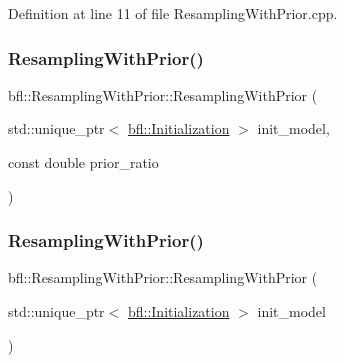 Definition at line 11 of file Resampling\+With\+Prior.\+cpp.

\mbox{\label{classbfl_1_1ResamplingWithPrior_a82ab650342bfcf94a302072827994db9}} 
\subsubsection{\texorpdfstring{Resampling\+With\+Prior()}{ResamplingWithPrior()}\hspace{0.1cm}{\footnotesize\ttfamily [2/4]}}
{\footnotesize\ttfamily bfl\+::\+Resampling\+With\+Prior\+::\+Resampling\+With\+Prior (\begin{DoxyParamCaption}\item[{std\+::unique\+\_\+ptr$<$ \mbox{\hyperlink{classbfl_1_1Initialization}{bfl\+::\+Initialization}} $>$}]{init\+\_\+model,  }\item[{const double}]{prior\+\_\+ratio }\end{DoxyParamCaption})\hspace{0.3cm}{\ttfamily [noexcept]}}

\mbox{\label{classbfl_1_1ResamplingWithPrior_a768d0bf1834f48d067a230b9554cb8cb}} 
\subsubsection{\texorpdfstring{Resampling\+With\+Prior()}{ResamplingWithPrior()}\hspace{0.1cm}{\footnotesize\ttfamily [3/4]}}
{\footnotesize\ttfamily bfl\+::\+Resampling\+With\+Prior\+::\+Resampling\+With\+Prior (\begin{DoxyParamCaption}\item[{std\+::unique\+\_\+ptr$<$ \mbox{\hyperlink{classbfl_1_1Initialization}{bfl\+::\+Initialization}} $>$}]{init\+\_\+model }\end{DoxyParamCaption})\hspace{0.3cm}{\ttfamily [noexcept]}}

